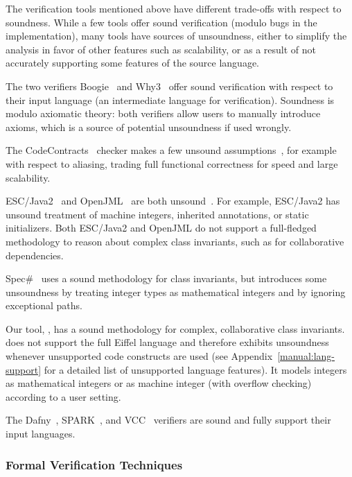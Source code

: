 The verification tools mentioned above have different trade-offs with respect to soundness. While a few tools offer sound verification (modulo bugs in the implementation), many tools have sources of unsoundness, either to simplify the analysis in favor of other features such as scalability, or as a result of not accurately supporting some features of the source language.

The two verifiers Boogie~\cite{LEINO08} and Why3~\cite{FILLIATRE13} offer sound verification with respect to their input language (an intermediate language for verification). Soundness is modulo axiomatic theory: both verifiers allow users to manually introduce axioms, which is a source of potential unsoundness if used wrongly.

The CodeContracts~\cite{LOGOZZO12} checker makes a few unsound assumptions~\cite{CHRISTAKIS15}, for example with respect to aliasing, trading full functional correctness for speed and large scalability.

ESC/Java2~\cite{COK05,CHALIN06} and OpenJML~\cite{COK11} are both unsound~\cite{KINIRY06,COK08}. For example, ESC/Java2 has unsound treatment of machine integers, inherited annotations, or static initializers. Both ESC/Java2 and OpenJML do not support a full-fledged methodology to reason about complex class invariants, such as for collaborative dependencies. 

Spec\#~\cite{BARNETT05} uses a sound methodology for class invariants, but introduces some unsoundness by treating integer types as mathematical integers and by ignoring exceptional paths.

Our tool, \AutoProof, has a sound methodology for complex, collaborative class invariants. \AutoProof does not support the full Eiffel language and therefore exhibits unsoundness whenever unsupported code constructs are used (see Appendix~\ref{manual:lang-support} for a detailed list of unsupported language features). It models integers as mathematical integers or as machine integer (with overflow checking) according to a user setting.

The Dafny~\cite{LEINO10}, SPARK~\cite{BARNES03}, and VCC~\cite{COHEN09} verifiers are sound and fully support their input languages.


\subsubsection{Formal Verification Techniques}

